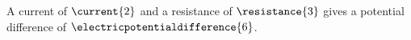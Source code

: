 \documentclass{article}
\begin{document}
A current of \( \current{2} \) and a resistance of \( \resistance{3} \) gives a potential
difference of \( \electricpotentialdifference{6} \).

\end{document}

